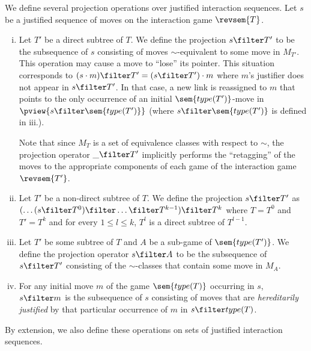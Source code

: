 \begin{definition}[Projection]
\label{def:sub_interstrat_projection}
We define several projection operations
over justified interaction sequences. Let $s$ be a justified
sequence of moves on the interaction game $\revsem{T}$.
\begin{enumerate}[i.]
\item  Let $T'$ be a direct subtree of $T$. We define the projection $s\filter T'$ to be the subsequence of $s$ consisting of moves $\sim$-equivalent to some move in $M_{T'}$. This operation may cause a move to ``lose'' its pointer. This situation corresponds to
    $(s \cdot m) \filter T' = (s \filter T') \cdot m$ where $m$'s justifier does not appear in $s \filter T'$.
    In that case, a new link is reassigned to $m$ that points to the only occurrence of an initial
    $\sem{type(T')}$-move in $\pview{s \filter \sem{type(T')}}$ (where $s \filter \sem{type(T')}$ is defined in iii.).

    Note that since $M_T$ is a set of equivalence classes with respect to $\sim$, the projection operator $\_ \filter T'$ implicitly performs the ``retagging'' of the moves to the appropriate components of each game of the interaction game $\revsem{T'}$.

\item  Let $T'$ be a non-direct subtree of $T$.
    We define the projection $s\filter T'$ as  $(\ldots (s\filter T^0) \filter \ldots \filter T^{k-1}) \filter T^k$
    where $T=T^0$ and $T'=T^k$ and for every $1\leq l \leq k$, $T^l$ is a direct subtree of $T^{l-1}$.

\item Let $T'$ be some subtree of $T$ and $A$ be a sub-game of $\sem{type(T')}$. We define the projection operator $s\filter A$ to be the subsequence of $s\filter T'$ consisting of the $\sim$-classes that contain some move in $M_A$.

\item For any initial move $m$ of the game $\sem{type(T)}$ occurring in $s$, $s \filter m$ is the subsequence of $s$ consisting of moves that are \emph{hereditarily justified} by that particular occurrence of $m$ in $s \filter type(T)$.
\end{enumerate}
By extension, we also define these operations on sets of justified interaction sequences.
\end{definition}


